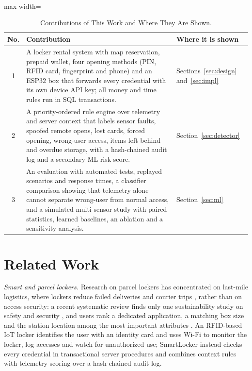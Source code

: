 \documentclass[manuscript,screen]{acmart}
\begin{document}
\begin{table}[htbp]
\centering
\footnotesize
\caption{Contributions of This Work and Where They Are Shown.}
\label{tab:contrib}
\begin{adjustbox}{max width=\textwidth}
\begin{tabular}{c p{11.9cm} p{2.7cm}}
\toprule
No. & Contribution & Where it is shown \\
\midrule
1 & A locker rental system with map reservation, prepaid wallet, four opening methods (PIN, RFID card, fingerprint and
    phone) and an ESP32 box that forwards every credential with its own device API key; all money and time rules run in SQL transactions. & Sections~\ref{sec:design} and~\ref{sec:impl} \\
2 & A priority-ordered rule engine over telemetry and server context that labels sensor faults, spoofed remote opens,
    lost cards, forced opening, wrong-user access, items left behind and overdue storage, with a hash-chained audit log and a secondary ML risk score. & Section~\ref{sec:detector} \\
3 & An evaluation with automated tests, replayed scenarios and response times, a classifier comparison showing that
    telemetry alone cannot separate wrong-user from normal access, and a simulated multi-sensor study with paired
    statistics, learned baselines, an ablation and a sensitivity analysis. & Section~\ref{sec:ml} \\
\bottomrule
\end{tabular}
\end{adjustbox}
\end{table}

\section{Related Work}

\textit{Smart and parcel lockers.} Research on parcel lockers has concentrated on last-mile logistics, where lockers
reduce failed deliveries and courier trips \cite{iwan2016parcel}, rather than on access security: a recent systematic
review finds only one sustainability study on safety and security \cite{zhang2025parcel}, and users rank a dedicated
application, a matching box size and the station location among the most important attributes
\cite{ciesla2023parcel}. An RFID-based IoT locker \cite{rfidiot2023locker} identifies the user with an identity card
and uses Wi-Fi to monitor the locker, log accesses and watch for unauthorized use; SmartLocker instead checks every
credential in transactional server procedures and combines context rules with telemetry scoring over a hash-chained
audit log.
\end{document}
